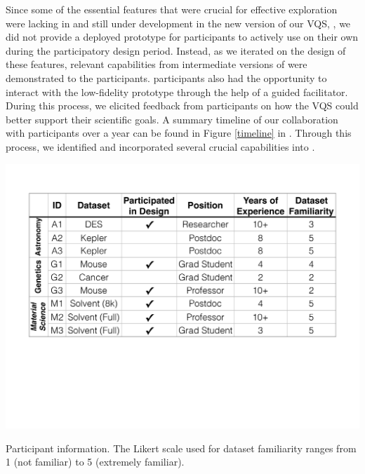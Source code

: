   \par Since some of the essential features that were crucial for effective exploration were lacking in \zv and still under development in the new version of our VQS, \zvpp, we did not provide a deployed prototype for participants to actively use on their own during the participatory design period. Instead, as we iterated on the design of these features, relevant capabilities from intermediate versions of \zvpp were demonstrated to the participants.  participants also had the opportunity to interact with the low-fidelity prototype through the help of a guided facilitator. %
  During this process, we elicited feedback from participants on how the VQS could better support their scientific goals. A summary timeline of our collaboration with participants over a year can be found in Figure \ref{timeline} in . %
  Through this process, we identified and incorporated several crucial capabilities into \zvpp{}. %
  \begin{table}[hb!]
    \centering
    \includegraphics[width=0.9\linewidth]{figures/participant_info.pdf}
    \caption{Participant information. The Likert scale used for dataset familiarity ranges from 1 (not familiar) to 5 (extremely familiar).}
    \label{participants}
    \vspace*{-10pt}
  \end{table}

